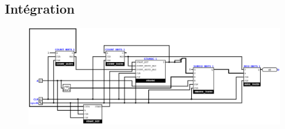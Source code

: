 \documentclass[a4paper]{article} %
\begin{document}
\subsection{Intégration}
\begin{tcolorbox}[colframe=Monokaimagenta,colback=white]
\begin{figure}[H]
\centering
    \includegraphics[width=.9\textwidth]{src/UART.png}
    \label{fig:uart}
\end{figure}


\end{tcolorbox}
\end{document}
